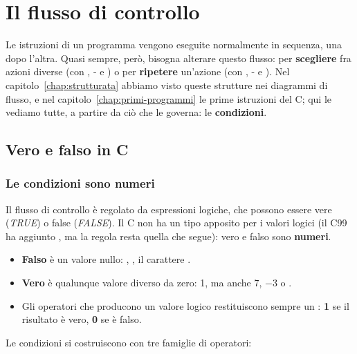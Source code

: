 \chapter{Il flusso di controllo}
\label{chap:flusso}

Le istruzioni di un programma vengono eseguite normalmente in sequenza, una
dopo l'altra. Quasi sempre, però, bisogna alterare questo flusso: per
\textbf{scegliere} fra azioni diverse (con , - e
) o per \textbf{ripetere} un'azione (con ,
- e ). Nel capitolo~\ref{chap:strutturata}
abbiamo visto queste strutture nei diagrammi di flusso, e nel
capitolo~\ref{chap:primi-programmi} le prime istruzioni del C; qui le vediamo
tutte, a partire da ciò che le governa: le \textbf{condizioni}.

\section{Vero e falso in C}

\subsection{Le condizioni sono numeri}

Il flusso di controllo è regolato da espressioni logiche, che possono essere
vere (\textit{TRUE}) o false (\textit{FALSE}). Il C non ha un tipo apposito
per i valori logici (il C99 ha aggiunto , ma la regola resta
quella che segue): vero e falso sono \textbf{numeri}.

\begin{itemize}
  \item \textbf{Falso} è un valore nullo: , , il carattere
        .
  \item \textbf{Vero} è qualunque valore diverso da zero: 1, ma anche 7,
        $-3$ o .
  \item Gli operatori che producono un valore logico restituiscono sempre un
        : \textbf{1} se il risultato è vero, \textbf{0} se è falso.
\end{itemize}

Le condizioni si costruiscono con tre famiglie di operatori:

